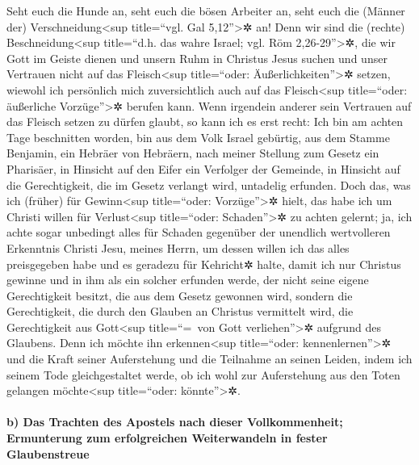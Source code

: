  Seht euch die Hunde an, seht euch die bösen Arbeiter an,
seht euch die (Männer der) Verschneidung\textless sup title=``vgl. Gal
5,12''\textgreater✲ an!  Denn wir sind die (rechte)
Beschneidung\textless sup title=``d.h. das wahre Israel; vgl. Röm
2,26-29''\textgreater✲, die wir Gott im Geiste dienen und unsern Ruhm in
Christus Jesus suchen und unser Vertrauen nicht auf das
Fleisch\textless sup title=``oder: Äußerlichkeiten''\textgreater✲
setzen,  wiewohl ich persönlich mich zuversichtlich auch
auf das Fleisch\textless sup title=``oder: äußerliche
Vorzüge''\textgreater✲ berufen kann. Wenn irgendein anderer sein
Vertrauen auf das Fleisch setzen zu dürfen glaubt, so kann ich es erst
recht:  Ich bin am achten Tage beschnitten worden, bin aus
dem Volk Israel gebürtig, aus dem Stamme Benjamin, ein Hebräer von
Hebräern, nach meiner Stellung zum Gesetz ein Pharisäer, 
in Hinsicht auf den Eifer ein Verfolger der Gemeinde, in Hinsicht auf
die Gerechtigkeit, die im Gesetz verlangt wird, untadelig erfunden.
 Doch das, was ich (früher) für Gewinn\textless sup
title=``oder: Vorzüge''\textgreater✲ hielt, das habe ich um Christi
willen für Verlust\textless sup title=``oder: Schaden''\textgreater✲ zu
achten gelernt;  ja, ich achte sogar unbedingt alles für
Schaden gegenüber der unendlich wertvolleren Erkenntnis Christi Jesu,
meines Herrn, um dessen willen ich das alles preisgegeben habe und es
geradezu für Kehricht✲ halte, damit ich nur Christus gewinne
 und in ihm als ein solcher erfunden werde, der nicht
seine eigene Gerechtigkeit besitzt, die aus dem Gesetz gewonnen wird,
sondern die Gerechtigkeit, die durch den Glauben an Christus vermittelt
wird, die Gerechtigkeit aus Gott\textless sup title=``=~von Gott
verliehen''\textgreater✲ aufgrund des Glaubens.  Denn ich
möchte ihn erkennen\textless sup title=``oder:
kennenlernen''\textgreater✲ und die Kraft seiner Auferstehung und die
Teilnahme an seinen Leiden, indem ich seinem Tode gleichgestaltet werde,
 ob ich wohl zur Auferstehung aus den Toten gelangen
möchte\textless sup title=``oder: könnte''\textgreater✲.

\hypertarget{b-das-trachten-des-apostels-nach-dieser-vollkommenheit-ermunterung-zum-erfolgreichen-weiterwandeln-in-fester-glaubenstreue}{%
\paragraph{b) Das Trachten des Apostels nach dieser Vollkommenheit;
Ermunterung zum erfolgreichen Weiterwandeln in fester
Glaubenstreue}\label{b-das-trachten-des-apostels-nach-dieser-vollkommenheit-ermunterung-zum-erfolgreichen-weiterwandeln-in-fester-glaubenstreue}}


